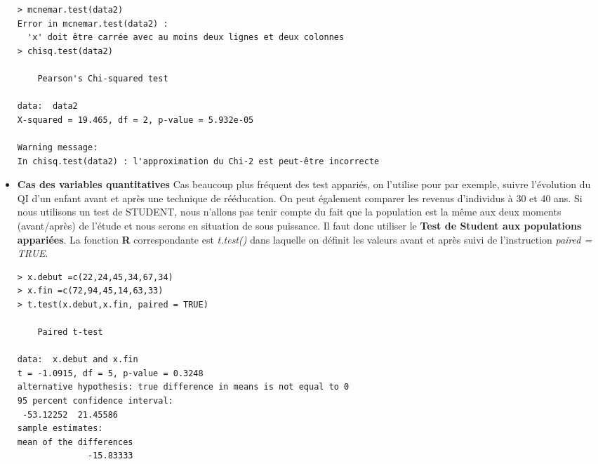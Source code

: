 \begin{itemize}
\begin{lstlisting}[language=html]
> mcnemar.test(data2)
Error in mcnemar.test(data2) : 
  'x' doit être carrée avec au moins deux lignes et deux colonnes
> chisq.test(data2)

	Pearson's Chi-squared test

data:  data2
X-squared = 19.465, df = 2, p-value = 5.932e-05

Warning message:
In chisq.test(data2) : l'approximation du Chi-2 est peut-être incorrecte
\end{lstlisting}


\item \textbf{Cas des variables quantitatives}\newline
Cas beaucoup plus fréquent des test appariés, on l'utilise pour par exemple, suivre l'évolution du QI d'un enfant avant et après une technique de rééducation. On peut également comparer les revenus d'individus à 30 et 40 ans. Si nous utilisons un test de STUDENT, nous n'allons pas tenir compte du fait que la population est la même aux deux moments (avant/après) de l'étude et nous serons en situation de sous puissance. Il faut donc utiliser le \textbf{Test de Student aux populations appariées}.\newline
La fonction \textbf{R} correspondante est \textit{t.test()} dans laquelle on définit les valeurs avant et après suivi de l'instruction \textit{paired = TRUE}.

\begin{lstlisting}[language=html]
> x.debut =c(22,24,45,34,67,34)
> x.fin =c(72,94,45,14,63,33)
> t.test(x.debut,x.fin, paired = TRUE)

	Paired t-test

data:  x.debut and x.fin
t = -1.0915, df = 5, p-value = 0.3248
alternative hypothesis: true difference in means is not equal to 0
95 percent confidence interval:
 -53.12252  21.45586
sample estimates:
mean of the differences 
              -15.83333 
\end{lstlisting}
\end{itemize}
\newpage
